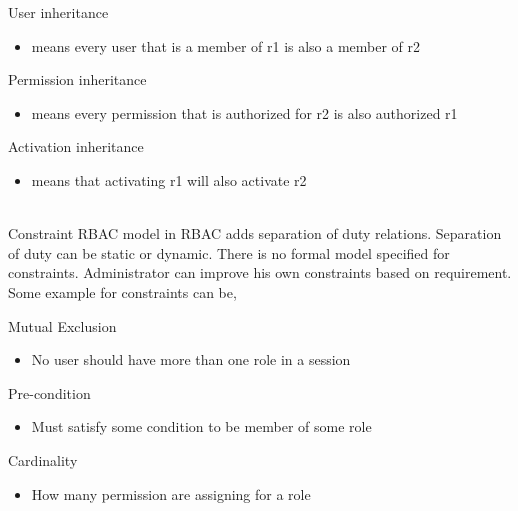 \documentclass[12pt]{report}
\begin{document}
		\begin{compactitem}
		\item User inheritance 
			\begin{itemize}
			\item means every user that is a member of r1 is also a member of r2
			\end{itemize}
			
		\item Permission inheritance
			\begin{itemize}
			\item means every permission that is authorized for r2 is also authorized r1 
			\end{itemize}					

		\item Activation inheritance 
			\begin{itemize}
			\item means that activating r1 will also activate r2
			\end{itemize}					

		\end{compactitem}
\hspace{4mm}\\
		Constraint RBAC model in RBAC adds separation of duty relations. Separation of duty can be static or dynamic. There is no formal model specified for constraints. Administrator can improve his own constraints based on requirement. Some example for constraints can be, \newline
		\begin{compactitem}
		
		
		\item Mutual Exclusion 
			\begin{itemize}
			\item No user should have more than one role in a session
			\end{itemize}
		\item Pre-condition
			\begin{itemize}
			\item Must satisfy some condition to be member of some role
			\end{itemize}					
		\item Cardinality 
		\begin{itemize}
			\item How many permission are assigning for a role
		\end{itemize}
		
		\end{compactitem}
\end{document}
